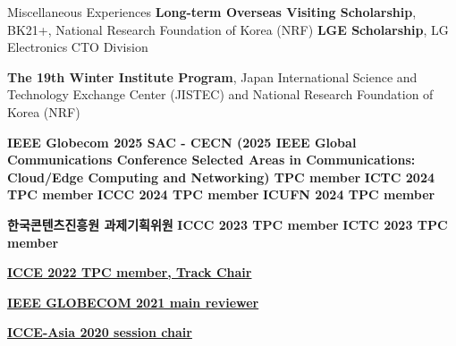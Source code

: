 \begin{rubric}{Miscellaneous Experiences}
\entry*[2015] \textbf{Long-term Overseas Visiting Scholarship}, \newline BK21+, National Research Foundation of Korea (NRF)
%
\entry*[2015] \textbf{LGE Scholarship}, \newline LG Electronics CTO Division

\entry*[2012] \textbf{The 19th Winter Institute Program}, \newline Japan International Science and Technology Exchange Center (JISTEC) and National Research Foundation of Korea (NRF)

\entry*[2025] \textbf{IEEE Globecom 2025 SAC - CECN (2025 IEEE Global Communications Conference Selected Areas in Communications: Cloud/Edge Computing and Networking) TPC member}
\entry*[2024] \textbf{ICTC 2024 TPC member}
\entry*[2024] \textbf{ICCC 2024 TPC member}
\entry*[2024] \textbf{ICUFN 2024 TPC member}

\entry*[2023] \textbf{한국콘텐츠진흥원 과제기획위원}
\entry*[2023] \textbf{ICCC 2023 TPC member} 
\entry*[2023] \textbf{ICTC 2023 TPC member} 

\entry*[2022] \faLink \href{https://edas.info/p28454}{\textbf{ICCE 2022 TPC member, Track Chair}}

\entry*[2021] \faLink \href{https://ieeexplore.ieee.org/abstract/document/9685923}{\textbf{IEEE GLOBECOM 2021 main reviewer}}

\entry*[2020] \faLink \href{http://icce-asia.cric.kr/2020/}{\textbf{ICCE-Asia 2020 session chair}}


\end{rubric}